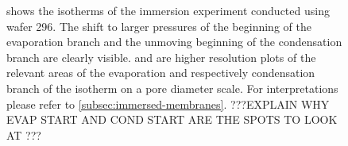 \documentclass[../../../thesis.tex]{subfiles}
\begin{document}
\begin{figure}[ht]
{
      \label{fig:immersion_cond_zoom}
    }
    \caption{\protect{} shows the isotherms of the immersion experiment conducted using wafer 296. The shift to larger pressures of the beginning of the evaporation branch and the unmoving beginning of the condensation branch are clearly visible. \protect{} and \protect{} are higher resolution plots of the relevant areas of the evaporation and respectively condensation branch of the isotherm on a pore diameter scale.  For interpretations please refer to \cref{subsec:immersed-membranes}. ???EXPLAIN WHY EVAP START AND COND START ARE THE SPOTS TO LOOK AT ???}
  \end{figure}
\end{document}
